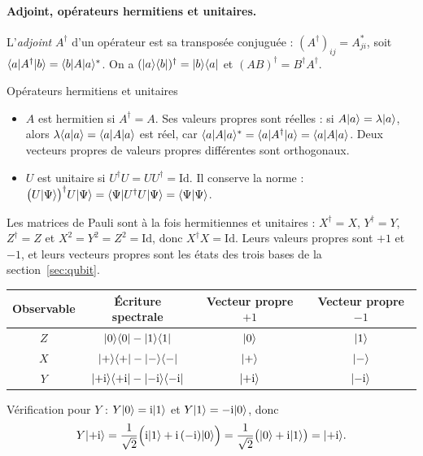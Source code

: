 \paragraph{Adjoint, opérateurs hermitiens et unitaires.} L'\emph{adjoint} $A^\dagger$ d'un opérateur
est sa transposée conjuguée : $(A^\dagger)_{ij}=A_{ji}^*$, soit $\langle a|A^\dagger|b\rangle=\langle b|A|a\rangle^*$.
On a $(|a\rangle\langle b|)^\dagger=|b\rangle\langle a|$ et $(AB)^\dagger=B^\dagger A^\dagger$.

\begin{definition}{Opérateurs hermitiens et unitaires}
\begin{itemize}[nosep]
  \item $A$ est \gls{hermitien} si $A^\dagger=A$. Ses valeurs propres sont réelles : si
        $A|a\rangle=\lambda|a\rangle$, alors $\lambda\langle a|a\rangle=\langle a|A|a\rangle$ est réel, car
        $\langle a|A|a\rangle^*=\langle a|A^\dagger|a\rangle=\langle a|A|a\rangle$. Deux vecteurs propres de valeurs
        propres différentes sont orthogonaux.
  \item $U$ est \gls{unitaire} si $U^\dagger U=UU^\dagger=\mathrm{Id}$. Il conserve la norme :
        $\big(U|\Psi\rangle\big)^\dagger U|\Psi\rangle=\langle \Psi|U^\dagger U|\Psi\rangle=\langle \Psi|\Psi\rangle$.
\end{itemize}
\end{definition}

Les matrices de Pauli sont à la fois hermitiennes et unitaires : $X^\dagger=X$, $Y^\dagger=Y$,
$Z^\dagger=Z$ et $X^2=Y^2=Z^2=\mathrm{Id}$, donc $X^\dagger X=\mathrm{Id}$. Leurs valeurs propres sont
$+1$ et $-1$, et leurs vecteurs propres sont les états des trois bases de la
section~\ref{sec:qubit}.

\begin{center}
\renewcommand{\arraystretch}{1.5}
\begin{tabular}{@{}c c c c@{}}
\toprule
\textbf{Observable} & \textbf{Écriture spectrale} & \textbf{Vecteur propre $+1$}
  & \textbf{Vecteur propre $-1$} \\
\midrule
$Z$ & $|0\rangle\langle 0|-|1\rangle\langle 1|$ & $|0\rangle$ & $|1\rangle$ \\
$X$ & $|+\rangle\langle +|-|-\rangle\langle -|$ & $|+\rangle$ & $|-\rangle$ \\
$Y$ & $|{+}\mathrm{i}\rangle\langle {+}\mathrm{i}|-|{-}\mathrm{i}\rangle\langle {-}\mathrm{i}|$ & $|{+}\mathrm{i}\rangle$ & $|{-}\mathrm{i}\rangle$ \\
\bottomrule
\end{tabular}
\end{center}

Vérification pour $Y$ : $Y|0\rangle=\mathrm{i}|1\rangle$ et $Y|1\rangle=-\mathrm{i}|0\rangle$, donc
\[
  Y|{+}\mathrm{i}\rangle=\frac{1}{\sqrt2}\Big(\mathrm{i}|1\rangle+\mathrm{i}\,(-\mathrm{i})|0\rangle\Big)
  =\frac{1}{\sqrt2}\big(|0\rangle+\mathrm{i}|1\rangle\big)=|{+}\mathrm{i}\rangle.
\]

